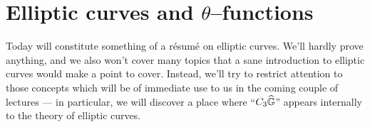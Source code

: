 









\section{Elliptic curves and $\theta$--functions}\label{SectionEllipticCurvesAndThetaFunctions}


Today will constitute something of a r\'esum\'e on elliptic curves.  We'll hardly prove anything, and we also won't cover many topics that a sane introduction to elliptic curves would make a point to cover.  Instead, we'll try to restrict attention to those concepts which will be of immediate use to us in the coming couple of lectures --- in particular, we will discover a place where ``$C_3 \widehat{\mathbb G}$'' appears internally to the theory of elliptic curves.

